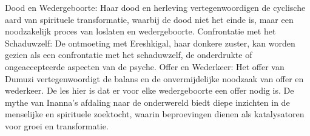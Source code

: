 Dood en Wedergeboorte: Haar dood en herleving vertegenwoordigen de cyclische aard van spirituele transformatie, waarbij de dood niet het einde is, maar een noodzakelijk proces van loslaten en wedergeboorte.
Confrontatie met het Schaduwzelf: De ontmoeting met Ereshkigal, haar donkere zuster, kan worden gezien als een confrontatie met het schaduwzelf, de onderdrukte of ongeaccepteerde aspecten van de psyche.
Offer en Wederkeer: Het offer van Dumuzi vertegenwoordigt de balans en de onvermijdelijke noodzaak van offer en wederkeer. De les hier is dat er voor elke wedergeboorte een offer nodig is.
De mythe van Inanna's afdaling naar de onderwereld biedt diepe inzichten in de menselijke en spirituele zoektocht, waarin beproevingen dienen als katalysatoren voor groei en transformatie.
